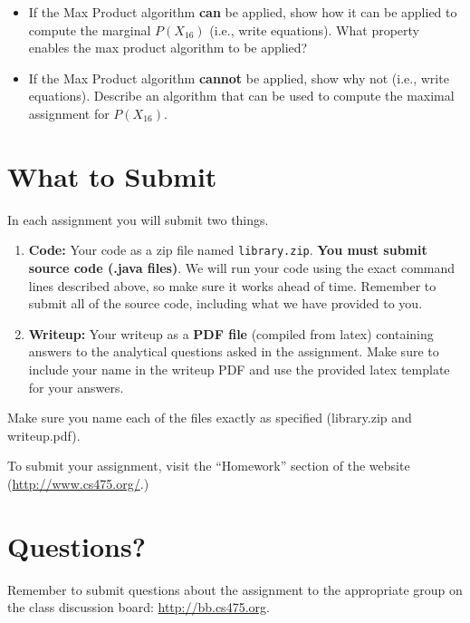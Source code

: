 \documentclass[11pt]{article}
\begin{document}
\begin{itemize}
\item If the Max Product algorithm {\bf can} be applied, show how it can be applied to compute the marginal $P(X_{16})$ (i.e., write equations). What property enables the max product algorithm to be applied?
\item If the Max Product algorithm {\bf cannot} be applied, show why not (i.e., write equations). Describe an algorithm that can be used to compute the maximal assignment for $P(X_{16})$.
\end{itemize}

\section{What to Submit}
In each assignment you will submit two things.
\begin{enumerate}
\item {\bf Code:} Your code as a zip file named {\tt library.zip}. {\bf You must submit source code (.java files)}. We will run your code using the exact command lines described above, so make sure it works ahead of time. Remember to submit all of the source code, including what we have provided to you.
\item {\bf Writeup:} Your writeup as a {\bf PDF file} (compiled from latex) containing answers to the analytical questions asked in the assignment. Make sure to include your name in the writeup PDF and use the provided latex template for your answers.
\end{enumerate}
Make sure you name each of the files exactly as specified (library.zip and writeup.pdf).

To submit your assignment, visit the ``Homework'' section of the website (\href{http://www.cs475.org/}{http://www.cs475.org/}.)

\section{Questions?}
Remember to submit questions about the assignment to the appropriate group on the class discussion board: \href{http://bb.cs475.org/}{http://bb.cs475.org}.
\end{document}

